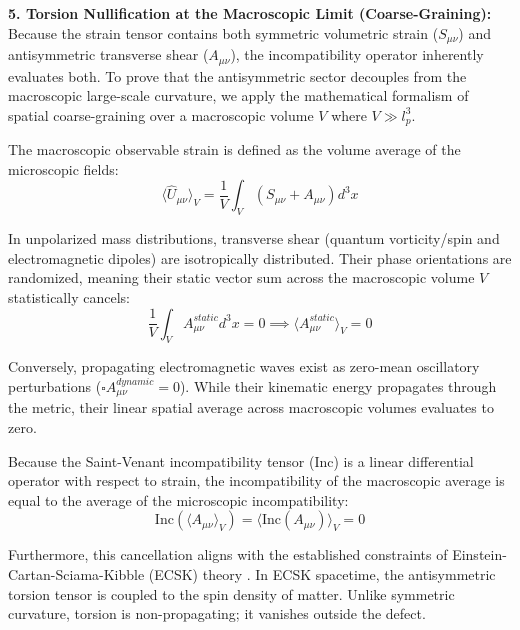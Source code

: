 \textbf{5. Torsion Nullification at the Macroscopic Limit (Coarse-Graining):} \\
Because the strain tensor contains both symmetric volumetric strain ($S_{\mu\nu}$) and antisymmetric transverse shear ($A_{\mu\nu}$), the incompatibility operator inherently evaluates both. To prove that the antisymmetric sector decouples from the macroscopic large-scale curvature, we apply the mathematical formalism of spatial coarse-graining over a macroscopic volume $V$ where $V \gg l_p^3$.

The macroscopic observable strain is defined as the volume average of the microscopic fields:
\begin{equation}
    \langle \hat{U}_{\mu\nu} \rangle_V = \frac{1}{V} \int_V \left( S_{\mu\nu} + A_{\mu\nu} \right) d^3x
\end{equation}

In unpolarized mass distributions, transverse shear (quantum vorticity/spin and electromagnetic dipoles) are isotropically distributed. Their phase orientations are randomized, meaning their static vector sum across the macroscopic volume $V$ statistically cancels: 
\begin{equation}
    \frac{1}{V} \int_V A_{\mu\nu}^{static} d^3x = 0 \implies \langle A_{\mu\nu}^{static} \rangle_V = 0 
\end{equation}

Conversely, propagating electromagnetic waves exist as zero-mean oscillatory perturbations ($\square A_{\mu\nu}^{dynamic} = 0$). While their kinematic energy propagates through the metric, their linear spatial average across macroscopic volumes evaluates to zero. 

Because the Saint-Venant incompatibility tensor ($\text{Inc}$) is a linear differential operator with respect to strain, the incompatibility of the macroscopic average is equal to the average of the microscopic incompatibility:
\begin{equation}
    \text{Inc}(\langle A_{\mu\nu} \rangle_V) = \langle \text{Inc}(A_{\mu\nu}) \rangle_V = 0
\end{equation}

Furthermore, this cancellation aligns with the established constraints of Einstein-Cartan-Sciama-Kibble (ECSK) theory \cite{kibble1961lorentz, sciama1964physical}. In ECSK spacetime, the antisymmetric torsion tensor is coupled to the spin density of matter. Unlike symmetric curvature, torsion is non-propagating; it vanishes outside the defect. 


